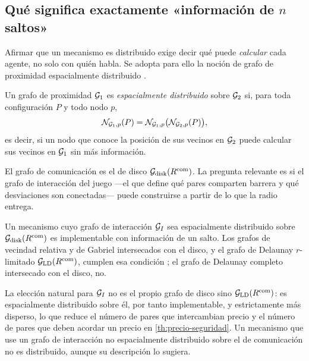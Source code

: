 \subsection{Qué significa exactamente «información de $n$ saltos»}
\label{sec:informacion}

Afirmar que un mecanismo es distribuido exige decir qué puede \emph{calcular}
cada agente, no solo con quién habla. Se adopta para ello la noción de grafo de
proximidad espacialmente distribuido \cite{bullo2009distributed}.

\begin{definicion}
\label{def:espacialmente}
Un grafo de proximidad $\mathcal{G}_1$ es \emph{espacialmente distribuido} sobre
$\mathcal{G}_2$ si, para toda configuración $P$ y todo nodo $p$,
\[
  \mathcal{N}_{\mathcal{G}_1,p}(P)=\mathcal{N}_{\mathcal{G}_1,p}\bigl(\mathcal{N}_{\mathcal{G}_2,p}(P)\bigr),
\]
es decir, si un nodo que conoce la posición de sus vecinos en $\mathcal{G}_2$ puede
calcular sus vecinos en $\mathcal{G}_1$ sin más información.
\end{definicion}

El grafo de comunicación es el de disco $\mathcal{G}_{\mathrm{disk}}(R^{\mathrm{com}})$.
La pregunta relevante es si el grafo de interacción del juego —el que define qué
pares comparten barrera y qué desviaciones son conectadas— puede construirse a
partir de lo que la radio entrega.

\begin{proposicion}
\label{pr:implementable}
Un mecanismo cuyo grafo de interacción $\mathcal{G}_I$ sea espacialmente distribuido
sobre $\mathcal{G}_{\mathrm{disk}}(R^{\mathrm{com}})$ es implementable con
información de un salto. Los grafos de vecindad relativa y de Gabriel
intersecados con el disco, y el grafo de Delaunay $r$-limitado
$\mathcal{G}_{\mathrm{LD}}(R^{\mathrm{com}})$, cumplen esa
condición \cite[Prop.~2.9]{bullo2009distributed}; el grafo de Delaunay completo
intersecado con el disco, no.
\end{proposicion}

\begin{observacion}
\label{obs:eleccion-grafo}
La elección natural para $\mathcal{G}_I$ no es el propio grafo de disco sino
$\mathcal{G}_{\mathrm{LD}}(R^{\mathrm{com}})$: es espacialmente distribuido sobre él,
por tanto implementable, y estrictamente más disperso, lo que reduce el número
de pares que intercambian precio y el número de pares que deben
acordar un precio en \cref{th:precio-seguridad}. Un mecanismo que use un grafo
de interacción no espacialmente distribuido sobre el de comunicación no es
distribuido, aunque su descripción lo sugiera.
\end{observacion}

